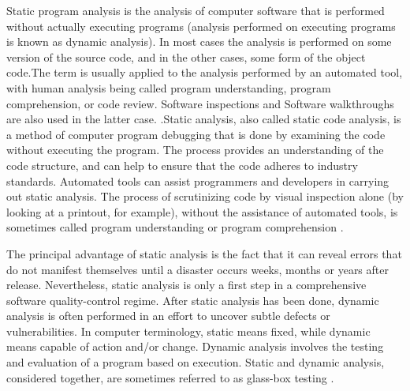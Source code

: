 Static program analysis is the analysis of computer software that is performed without actually executing programs (analysis performed on executing programs is known as dynamic analysis). In most cases the analysis is performed on some version of the source code, and in the other cases, some form of the object code.The term is usually applied to the analysis performed by an automated tool, with human analysis being called program understanding, program comprehension, or code review. Software inspections and Software walkthroughs are also used in the latter case. .Static analysis, also called static code analysis, is a method of computer program debugging that is done by examining the code without executing the program. The process provides an understanding of the code structure, and can help to ensure that the code adheres to industry standards. Automated tools can assist programmers and developers in carrying out static analysis. The process of scrutinizing code by visual inspection alone (by looking at a printout, for example), without the assistance of automated tools, is sometimes called program understanding or program comprehension \cite{ref_86_techtarget:techtarget}.

The principal advantage of static analysis is the fact that it can reveal errors that do not manifest themselves until a disaster occurs weeks, months or years after release. Nevertheless, static analysis is only a first step in a comprehensive software quality-control regime. After static analysis has been done, dynamic analysis is often performed in an effort to uncover subtle defects or vulnerabilities. In computer terminology, static means fixed, while dynamic means capable of action and/or change. Dynamic analysis involves the testing and evaluation of a program based on execution. Static and dynamic analysis, considered together, are sometimes referred to as glass-box testing \cite{ref_86_techtarget:techtarget}.

